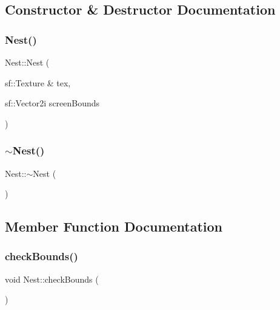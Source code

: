 \subsection{Constructor \& Destructor Documentation}
\mbox{\label{class_nest_af88d2bfa6f9d0b0c48982ff54fe31cf9}} 
\subsubsection{\texorpdfstring{Nest()}{Nest()}}
{\footnotesize\ttfamily Nest\+::\+Nest (\begin{DoxyParamCaption}\item[{sf\+::\+Texture \&}]{tex,  }\item[{sf\+::\+Vector2i}]{screen\+Bounds }\end{DoxyParamCaption})}

\mbox{\label{class_nest_a3e879ba15acd31717b1dc9bdc87488d5}} 
\subsubsection{\texorpdfstring{$\sim$\+Nest()}{~Nest()}}
{\footnotesize\ttfamily Nest\+::$\sim$\+Nest (\begin{DoxyParamCaption}{ }\end{DoxyParamCaption})}



\subsection{Member Function Documentation}
\mbox{\label{class_nest_ad3c58a10bcb55df97a6d0e7923924f0b}} 
\subsubsection{\texorpdfstring{check\+Bounds()}{checkBounds()}}
{\footnotesize\ttfamily void Nest\+::check\+Bounds (\begin{DoxyParamCaption}{ }\end{DoxyParamCaption})}

\mbox{\label{class_nest_a6e4950498b1c767c513e1a5fac4259e5}} 
